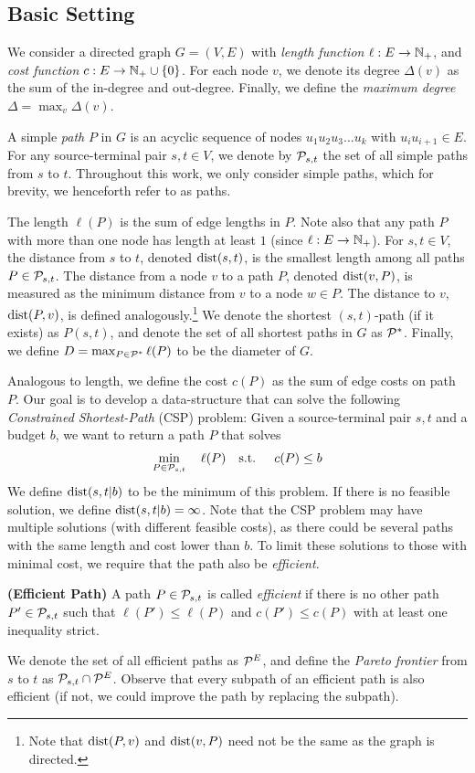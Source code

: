 
\subsection{Basic Setting}
\label{ssec:basic}

We consider a directed graph $G=(V,E)$ with \emph{length function} $\ell:E\to \mathbb{N}_+$, and \emph{cost function} $c:E\to \mathbb{N}_+\cup\{0\}$.
For each node $v$, we denote its degree $\Delta(v)$ as the sum of the in-degree and out-degree.
Finally, we define the \emph{maximum degree} $\Delta = \max_v\Delta(v)$.


A simple \emph{path} $P$ in $G$ is an acyclic sequence of nodes  $u_1u_2u_3\ldots u_k$ with $u_iu_{i+1}\in E$.
For any source-terminal pair $s,t\in V$, we denote by $\mathcal{P}_{s,t}$ the set of all simple paths from $s$ to $t$.
Throughout this work, we only consider simple paths, which for brevity, we henceforth refer to as paths.

The length $\ell(P)$ is the sum of edge lengths in $P$. Note also that any path $P$ with more than one node has length at least $1$ (since $\ell:E\to \mathbb{N}_+$).
For $s,t\in V$, the distance from $s$ to $t$, denoted $\mbox{dist}(s,t)$, is the smallest length among all paths $P\in\mathcal{P}_{s,t}$.
The distance from a node $v$ to a path $P$, denoted $\mbox{dist}(v,P)$, is measured as the minimum distance from $v$ to a node $w\in P$.
The distance to $v$, $\mbox{dist}(P,v)$, is defined analogously.\footnote{Note that  $\mbox{dist}(P,v)$ and  $\mbox{dist}(v,P)$ need not be the same as the graph is directed.}
We denote the shortest $(s,t)$-path (if it exists) as $P(s,t)$, and denote the set of all shortest paths in $G$ as $\mathcal{P}^*$.
Finally, we define $D=\max_{P\in\mathcal{P}^*}\ell(P)$ to be the diameter of $G$.


Analogous to length, we define the cost $c(P)$ as the sum of edge costs on path $P$. 
Our goal is to develop a data-structure that can solve the following \emph{Constrained Shortest-Path} (CSP) problem: Given a source-terminal pair $s,t$ and a budget $b$, we want to return a path $P$ that solves
\begin{align*}
\min_{P \in \mathcal{P}_{s,t}}  \quad \ell(P) \quad
\text{s.t. } \quad  c(P) \leq b 
\end{align*}
We define $\mbox{dist}(s,t|b)$ to be the minimum of this problem.
If there is no feasible solution, we define $\mbox{dist}(s,t|b)=\infty$.
Note that the CSP problem may have multiple solutions (with different feasible costs), as there could be several paths with the same length and cost lower than $b$.
To limit these solutions to those with minimal cost, we require that the path also be \emph{efficient}. 
\begin{definition}
\textbf{(Efficient Path)} A path $P\in \mathcal{P}_{s,t}$ is called \emph{efficient} if there is no other path $P'\in \mathcal{P}_{s,t}$ such that $\ell(P')\leq \ell(P)$ and $c(P')\leq c(P)$ with at least one inequality strict.
\end{definition}
We denote the set of all efficient paths as $\mathcal{P}^E$, and define the \emph{Pareto frontier} from $s$ to $t$ as $\mathcal{P}_{s,t}\cap\mathcal{P}^E$.
Observe that every subpath of an efficient path is also efficient (if not, we could improve the path by replacing the subpath).

